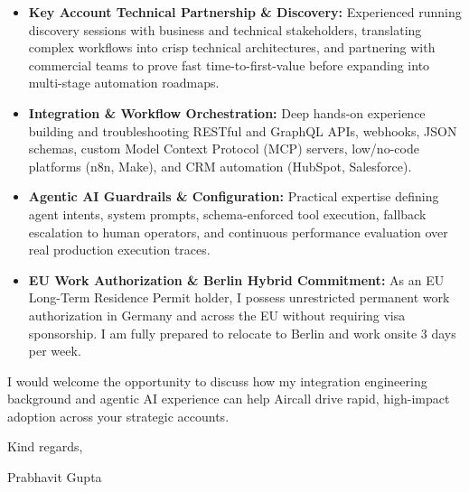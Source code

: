 \documentclass[11pt,a4paper]{article}
\begin{document}
\begin{itemize}[leftmargin=*]
    \item \textbf{Key Account Technical Partnership \& Discovery:} Experienced running discovery sessions with business and technical stakeholders, translating complex workflows into crisp technical architectures, and partnering with commercial teams to prove fast time-to-first-value before expanding into multi-stage automation roadmaps.
    \item \textbf{Integration \& Workflow Orchestration:} Deep hands-on experience building and troubleshooting RESTful and GraphQL APIs, webhooks, JSON schemas, custom Model Context Protocol (MCP) servers, low/no-code platforms (n8n, Make), and CRM automation (HubSpot, Salesforce).
    \item \textbf{Agentic AI Guardrails \& Configuration:} Practical expertise defining agent intents, system prompts, schema-enforced tool execution, fallback escalation to human operators, and continuous performance evaluation over real production execution traces.
    \item \textbf{EU Work Authorization \& Berlin Hybrid Commitment:} As an EU Long-Term Residence Permit holder, I possess unrestricted permanent work authorization in Germany and across the EU without requiring visa sponsorship. I am fully prepared to relocate to Berlin and work onsite 3 days per week.
\end{itemize}

\noindent I would welcome the opportunity to discuss how my integration engineering background and agentic AI experience can help Aircall drive rapid, high-impact adoption across your strategic accounts.

\vspace{8pt}

\noindent Kind regards,

\vspace{6pt}

\noindent Prabhavit Gupta
\end{document}
